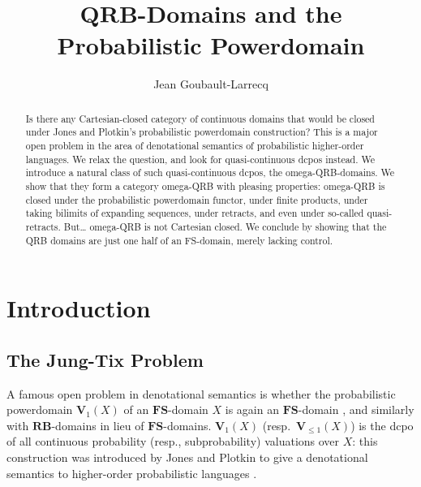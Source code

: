 \documentclass{LMCS}
\newcommand\QRB{\mathbf{QRB}}
\newcommand\RB{\mathbf{RB}}
\newcommand\FS{\mathbf{FS}}
\newcommand\Val{\mathbf V}
\begin{document}
\title[QRB-Domains]{$\QRB$-Domains and the Probabilistic Powerdomain\rsuper*}

\author[J.~Goubault-Larrecq]{Jean Goubault-Larrecq}	\address{LSV, ENS Cachan, CNRS, INRIA, France}	  













\begin{abstract}
  Is there any Cartesian-closed category of continuous domains that
  would be closed under Jones and Plotkin's probabilistic powerdomain
  construction?  This is a major open problem in the area of
  denotational semantics of probabilistic higher-order languages.  We
  relax the question, and look for quasi-continuous dcpos instead.
We introduce a natural class of such quasi-continuous dcpos, the
  omega-QRB-domains.  We show that they form a category omega-QRB with
  pleasing properties: omega-QRB is closed under the probabilistic
  powerdomain functor, under finite products, under taking bilimits of
  expanding sequences, under retracts, and even under so-called
  quasi-retracts.  But\ldots{} omega-QRB is not Cartesian closed.  We
  conclude by showing that the QRB domains are just one half of an
  FS-domain, merely lacking control.
\end{abstract}

\maketitle




\section{Introduction}
\label{sec:intro}

\subsection{The Jung-Tix Problem}
A famous open problem in denotational semantics is whether the
probabilistic powerdomain $\Val_1 (X)$ of an $\FS$-domain $X$ is again
an $\FS$-domain \cite{JT:troublesome}, and similarly with
$\RB$-domains in lieu of $\FS$-domains.  $\Val_1 (X)$ (resp.\
$\Val_{\leq 1} (X)$) is the dcpo of all continuous probability (resp.,
subprobability) valuations over $X$: this construction was introduced
by Jones and Plotkin to give a denotational semantics to higher-order
probabilistic languages \cite{JP:proba}.
\end{document}
